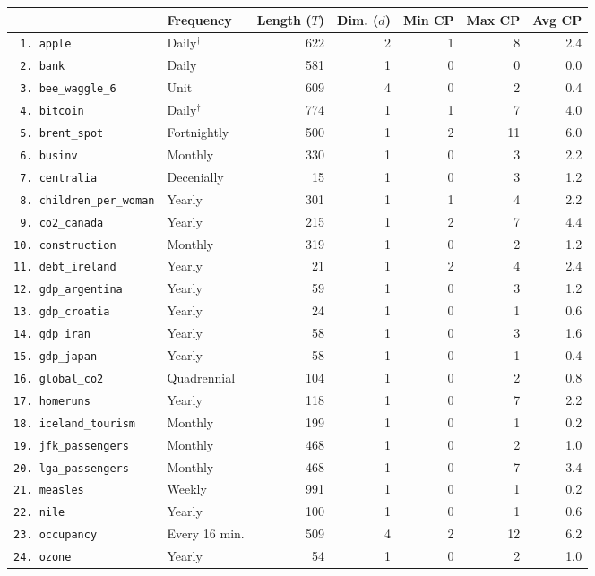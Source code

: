 \begin{tabular}{llrrrrr}
 & Frequency & Length ($T$) & Dim. ($d$) & Min CP & Max CP & Avg CP\\
\toprule
\verb+ 1. apple+ & Daily$^{\dagger}$ & 622 & 2 & 1 & 8 & 2.4 \\
\verb+ 2. bank+ & Daily & 581 & 1 & 0 & 0 & 0.0 \\
\verb+ 3. bee_waggle_6+ & Unit & 609 & 4 & 0 & 2 & 0.4 \\
\verb+ 4. bitcoin+ & Daily$^{\dagger}$ & 774 & 1 & 1 & 7 & 4.0 \\
\verb+ 5. brent_spot+ & Fortnightly & 500 & 1 & 2 & 11 & 6.0 \\
\verb+ 6. businv+ & Monthly & 330 & 1 & 0 & 3 & 2.2 \\
\verb+ 7. centralia+ & Decenially & 15 & 1 & 0 & 3 & 1.2 \\
\verb+ 8. children_per_woman+ & Yearly & 301 & 1 & 1 & 4 & 2.2 \\
\verb+ 9. co2_canada+ & Yearly & 215 & 1 & 2 & 7 & 4.4 \\
\verb+10. construction+ & Monthly & 319 & 1 & 0 & 2 & 1.2 \\
\verb+11. debt_ireland+ & Yearly & 21 & 1 & 2 & 4 & 2.4 \\
\verb+12. gdp_argentina+ & Yearly & 59 & 1 & 0 & 3 & 1.2 \\
\verb+13. gdp_croatia+ & Yearly & 24 & 1 & 0 & 1 & 0.6 \\
\verb+14. gdp_iran+ & Yearly & 58 & 1 & 0 & 3 & 1.6 \\
\verb+15. gdp_japan+ & Yearly & 58 & 1 & 0 & 1 & 0.4 \\
\verb+16. global_co2+ & Quadrennial & 104 & 1 & 0 & 2 & 0.8 \\
\verb+17. homeruns+ & Yearly & 118 & 1 & 0 & 7 & 2.2 \\
\verb+18. iceland_tourism+ & Monthly & 199 & 1 & 0 & 1 & 0.2 \\
\verb+19. jfk_passengers+ & Monthly & 468 & 1 & 0 & 2 & 1.0 \\
\verb+20. lga_passengers+ & Monthly & 468 & 1 & 0 & 7 & 3.4 \\
\verb+21. measles+ & Weekly & 991 & 1 & 0 & 1 & 0.2 \\
\verb+22. nile+ & Yearly & 100 & 1 & 0 & 1 & 0.6 \\
\verb+23. occupancy+ & Every 16 min. & 509 & 4 & 2 & 12 & 6.2 \\
\verb+24. ozone+ & Yearly & 54 & 1 & 0 & 2 & 1.0 \\

\end{tabular}
